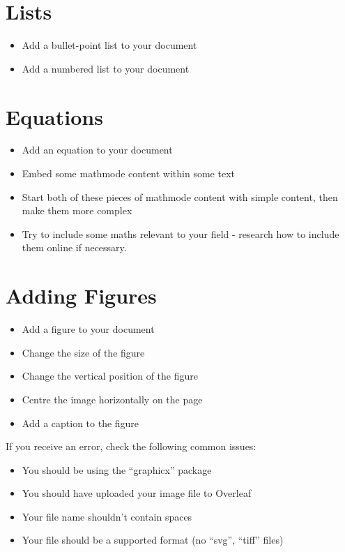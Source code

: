 \documentclass[11pt,a4paper]{article}
\begin{document}
\section{Lists}
\begin{itemize}
\item Add a bullet-point list to your document
\item Add a numbered list to your document
\end{itemize}

\section{Equations}
\begin{itemize}
\item Add an equation to your document
\item Embed some mathmode content within some text
\item Start both of these pieces of mathmode content with simple content, then make them more complex
\item Try to include some maths relevant to your field - research how to include them online if necessary.
\end{itemize}

\section{Adding Figures}
\begin{itemize}
\item Add a figure to your document
\item Change the size of the figure
\item Change the vertical position of the figure
\item Centre the image horizontally on the page
\item Add a caption to the figure
\end{itemize}

If you receive an error, check the following common issues:

\begin{itemize}
\item You should be using the ``graphicx'' package
\item You should have uploaded your image file to Overleaf
\item Your file name shouldn't contain spaces
\item Your file should be a supported format (no ``svg'', ``tiff'' files)
\end{itemize}
\end{document}

